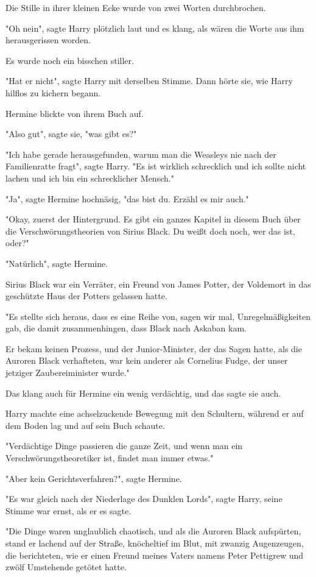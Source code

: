 {Die Stille in ihrer kleinen Ecke wurde von zwei Worten durchbrochen.

"Oh nein", sagte Harry plötzlich laut und es klang, als wären die Worte aus ihm herausgerissen worden.

Es wurde noch ein bisschen stiller.

"Hat er nicht", sagte Harry mit derselben Stimme. Dann hörte sie, wie Harry hilflos zu kichern begann.

Hermine blickte von ihrem Buch auf.

"Also gut", sagte sie, "was gibt es?"

"Ich habe gerade herausgefunden, warum man die Weasleys nie nach der Familienratte fragt", sagte Harry. "Es ist wirklich schrecklich und ich sollte nicht lachen und ich bin ein schrecklicher Mensch."

"Ja", sagte Hermine hochnäsig, "das bist du. Erzähl es mir auch."

"Okay, zuerst der Hintergrund. Es gibt ein ganzes Kapitel in diesem Buch über die Verschwörungstheorien von Sirius Black. Du weißt doch noch, wer das ist, oder?"

"Natürlich", sagte Hermine.

Sirius Black war ein Verräter, ein Freund von James Potter, der Voldemort in das geschützte Haus der Potters gelassen hatte.

"Es stellte sich heraus, dass es eine Reihe von, sagen wir mal, Unregelmäßigkeiten gab, die damit zusammenhingen, dass Black nach Askaban kam.

Er bekam keinen Prozess, und der Junior-Minister, der das Sagen hatte, als die Auroren Black verhafteten, war kein anderer als Cornelius Fudge, der unser jetziger Zaubereiminister wurde."

Das klang auch für Hermine ein wenig verdächtig, und das sagte sie auch.

Harry machte eine achselzuckende Bewegung mit den Schultern, während er auf dem Boden lag und auf sein Buch schaute.

"Verdächtige Dinge passieren die ganze Zeit, und wenn man ein Verschwörungstheoretiker ist, findet man immer etwas."

"Aber kein Gerichtsverfahren?", sagte Hermine.

"Es war gleich nach der Niederlage des Dunklen Lords", sagte Harry, seine Stimme war ernst, als er es sagte.

"Die Dinge waren unglaublich chaotisch, und als die Auroren Black aufspürten, stand er lachend auf der Straße, knöcheltief im Blut, mit zwanzig Augenzeugen, die berichteten, wie er einen Freund meines Vaters namens Peter Pettigrew und zwölf Umstehende getötet hatte.

}
